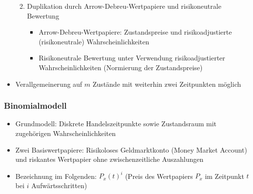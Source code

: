 \begin{itemize}
\begin{enumerate}
\begin{itemize}
		\end{itemize}
		\item Duplikation durch Arrow-Debreu-Wertpapiere und risikoneutrale Bewertung
		\begin{itemize}
			\item Arrow-Debreu-Wertpapiere: Zustandspreise und risikoadjustierte (risikoneutrale) Wahrscheinlichkeiten
			\item Risikoneutrale Bewertung unter Verwendung risikoadjustierter Wahrscheinlichkeiten (Normierung der Zustandspreise)
		\end{itemize}
	\end{enumerate}
	\item Verallgemeinerung auf \(m\) Zustände mit weiterhin zwei Zeitpunkten möglich
\end{itemize}

\subsubsection{Binomialmodell}
\begin{itemize}
	\item Grundmodell: Diskrete Handelszeitpunkte sowie Zustandsraum mit zugehörigen Wahrscheinlichkeiten
	\item Zwei Basiswertpapiere: Risikoloses Geldmarktkonto (Money Market Account) und riskantes Wertpapier ohne zwischenzeitliche Auszahlungen
	\item Bezeichnung im Folgenden: \(P_x(t)^i\) (Preis des Wertpapiers \(P_x\) im Zeitpunkt \(t\) bei \(i\) Aufwärtsschritten)
\end{itemize}

